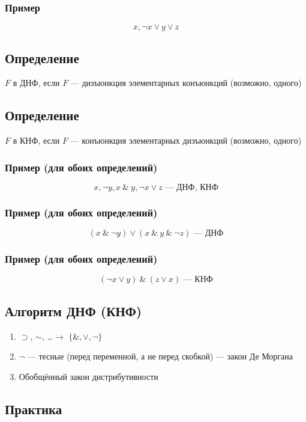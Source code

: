 \documentclass{article}
\begin{document}
\subsubsection{Пример}
\[
    x, \neg x \vee y \vee z
\]


\subsection{Определение}
$F$ в ДНФ, если $F$ --- дизъюнкция элементарных конъюнкций (возможно, одного)


\subsection{Определение}
$F$ в КНФ, если $F$ --- конъюнкция элементарных дизъюнкций (возможно, одного)

\subsubsection{Пример (для обоих определений)}
\[
    x, \neg y, x ~\&~ y, \neg x \vee z \text{ --- ДНФ, КНФ}
\]

\subsubsection{Пример (для обоих определений)}
\[
    (x ~\&~ \neg y) \vee (x ~\&~ y ~\&~ \neg z) \text{ --- ДНФ}
\]

\subsubsection{Пример (для обоих определений)}
\[
    (\neg x \vee y) ~\&~ (z \vee x) \text{ --- КНФ}
\]



\subsection{Алгоритм ДНФ (КНФ)}
\begin{enumerate}
    \item $\supset$, $\sim$, \dots $\rightarrow$ $\{\&, \vee, \neg\}$
    \item $\neg$ --- тесные (перед переменной, а не перед скобкой) --- закон Де Моргана
    \item Обобщённый закон дистрибутивности
\end{enumerate}


\subsection{Практика}
\end{document}
